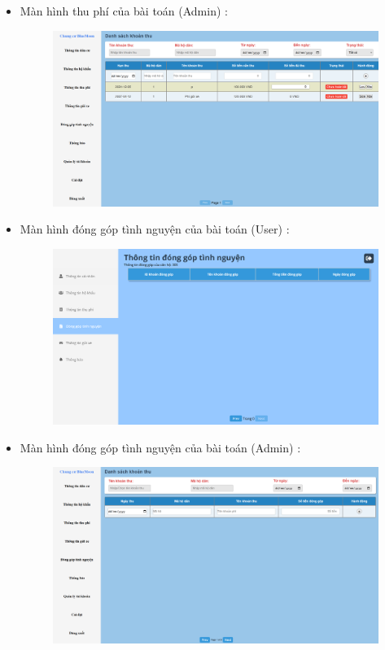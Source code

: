 \documentclass{article}
\begin{document}
\begin{itemize}
\begin{figure}[H]
    \end{figure}
    \item Màn hình thu phí của bài toán (Admin) :
    \begin{figure}[H]
        \centering
        \includegraphics[width=1\textwidth]{Ảnh chương 4/Thu phí 1.png}
    \end{figure}
    \newpage
    \item Màn hình đóng góp tình nguyện của bài toán (User) :
    \begin{figure}[H]
        \centering
        \includegraphics[width=1\textwidth]{Ảnh chương 4/Tình nguyện 2.png}
    \end{figure}
    \vspace{1cm}
    \item Màn hình đóng góp tình nguyện của bài toán (Admin) :
    \begin{figure}[H]
        \centering
        \includegraphics[width=1\textwidth]{Ảnh chương 4/Tình nguyện 1.png}

\end{figure}
\end{itemize}
\end{document}
